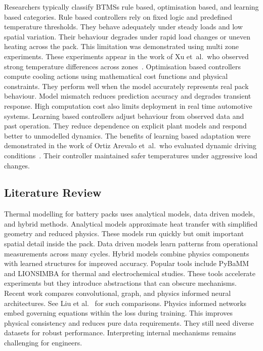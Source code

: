 \documentclass{article}
\begin{document}
Researchers typically classify BTMSs rule based, optimisation based, and learning based categories.
Rule based controllers rely on fixed logic and predefined temperature thresholds.
They behave adequately under steady loads and low spatial variation.
Their behaviour degrades under rapid load changes or uneven heating across the pack.
This limitation was demonstrated using multi zone experiments.
These experiments appear in the work of Xu et~al.\ who observed strong temperature differences across zones~\cite{Xu2019Thermoelectric}.
Optimisation based controllers compute cooling actions using mathematical cost functions and physical constraints.
They perform well when the model accurately represents real pack behaviour.
Model mismatch reduces prediction accuracy and degrades transient response.
High computation cost also limits deployment in real time automotive systems.
Learning based controllers adjust behaviour from observed data and past operation.
They reduce dependence on explicit plant models and respond better to unmodelled dynamics.
The benefits of learning based adaptation were demonstrated in the work of Ortiz Arevalo et~al.\ who evaluated dynamic driving conditions~\cite{OrtizArevalo2024}.
Their controller maintained safer temperatures under aggressive load changes.

\subsection{Literature Review}

Thermal modelling for battery packs uses analytical models, data driven models, and hybrid methods.
Analytical models approximate heat transfer with simplified geometry and reduced physics.
These models run quickly but omit important spatial detail inside the pack.
Data driven models learn patterns from operational measurements across many cycles.
Hybrid models combine physics components with learned structures for improved accuracy.
Popular tools include PyBaMM and LIONSIMBA for thermal and electrochemical studies.
These tools accelerate experiments but they introduce abstractions that can obscure mechanisms.
Recent work compares convolutional, graph, and physics informed neural architectures.
See Liu et al.~\cite{Liu2024} for such comparisons.
Physics informed networks embed governing equations within the loss during training.
This improves physical consistency and reduces pure data requirements.
They still need diverse datasets for robust performance.
Interpreting internal mechanisms remains challenging for engineers.
\end{document}
